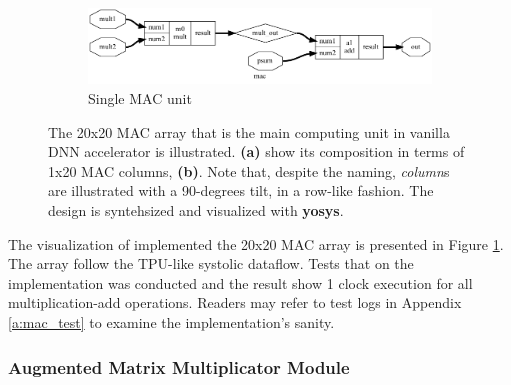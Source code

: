 \documentclass[11pt]{article}
\begin{document}
\begin{figure}[H]
\begin{subfigure}{.45\textwidth}
\begin{framed}
        \includegraphics[width=\linewidth]{images/mac.dot.png}
        \caption{Single MAC unit}
      \end{framed}
    \end{subfigure}
    \caption{The 20x20 MAC array that is the main computing unit in vanilla DNN accelerator is illustrated. \textbf{(a)} show its composition in terms of 1x20 MAC columns, \textbf{(b)}. Note that, despite the naming, \textit{column}s are illustrated with a 90-degrees tilt, in a row-like fashion. The design is syntehsized and visualized with \textbf{yosys}.\label{fig:macs}}
\end{figure}

The visualization of implemented the 20x20 MAC array is presented in Figure \ref{fig:macs}. The array follow the TPU-like systolic dataflow. Tests that on the implementation was conducted and the result show 1 clock execution for all multiplication-add operations. Readers may refer to test logs in Appendix \ref{a:mac_test} to examine the implementation's sanity.

\subsubsection{Augmented Matrix Multiplicator Module}
\end{document}
